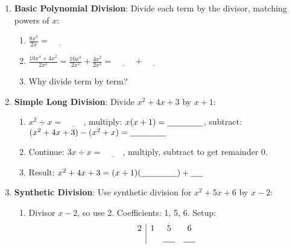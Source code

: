 \documentclass[12pt]{article}
\begin{document}
\begin{enumerate}[label=9.\arabic*]
    \item \textbf{Basic Polynomial Division}: Divide each term by the divisor, matching powers of \( x \):
    \begin{enumerate}[label=\alph*)]
        \item \( \frac{8x^3}{2x} = \underline{\hspace{1cm}} \)
        \item \( \frac{10x^4 + 4x^2}{2x^2} = \frac{10x^4}{2x^2} + \frac{4x^2}{2x^2} = \underline{\hspace{1cm}} + \underline{\hspace{1cm}} \)
        \item Why divide term by term? \underline{\hspace{6cm}}
    \end{enumerate}
    \item \textbf{Simple Long Division}: Divide \( x^2 + 4x + 3 \) by \( x + 1 \):
    \begin{enumerate}[label=\alph*)]
        \item \( x^2 \div x = \underline{\hspace{1cm}} \), multiply: \( x(x + 1) = \underline{\hspace{1.5cm}} \), subtract: \( (x^2 + 4x + 3) - (x^2 + x) = \underline{\hspace{1.5cm}} \)
        \item Continue: \( 3x \div x = \underline{\hspace{1cm}} \), multiply, subtract to get remainder 0.
        \item Result: \( x^2 + 4x + 3 = (x + 1)(\underline{\hspace{1.5cm}}) + \underline{\hspace{0.5cm}} \)
    \end{enumerate}
    \item \textbf{Synthetic Division}: Use synthetic division for \( x^2 + 5x + 6 \) by \( x - 2 \):
    \begin{enumerate}[label=\alph*)]
        \item Divisor \( x - 2 \), so use 2. Coefficients: 1, 5, 6. Setup: \\
        \[
        \begin{array}{c|ccc}
        2 & 1 & 5 & 6 \\
          &   & \underline{\hspace{0.5cm}} & \underline{\hspace{0.5cm}} \\

\end{array}\]
\end{enumerate}
\end{enumerate}
\end{document}
